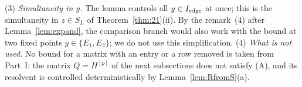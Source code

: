 (3) \emph{Simultaneity in $y$.} The lemma controls all $y\in I_{\rm edge}$ at once; this is the simultaneity in $z\in S_L$ of Theorem~\ref{thm:21}(ii). By the remark~(4)
after Lemma~\ref{lem:expand}, the comparison branch would also work with the bound at two fixed points $y\in\{E_1,E_2\}$; we do not use this simplification.
(4) \emph{What is not used.} No bound for a matrix with an entry or a row removed is taken from Part~I: the matrix $Q=H^{[p]}$ of the next subsections does not satisfy (A),
and its resolvent is controlled deterministically by Lemma~\ref{lem:RfromS}(a).
